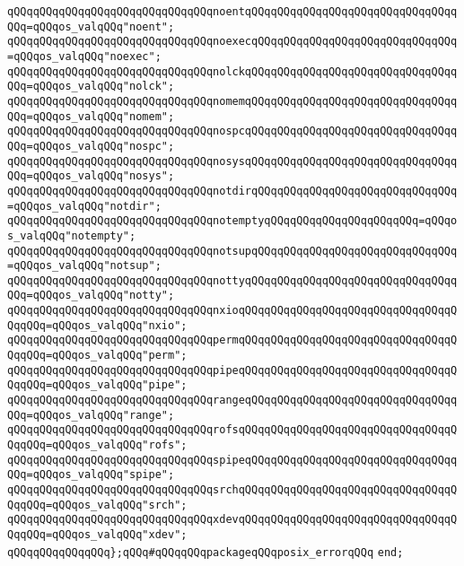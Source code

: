 \verb|qQQqqQQqqQQqqQQqqQQqqQQqqQQqqQQqnoentqQQqqQQqqQQqqQQqqQQqqQQqqQQqqQQqqQQq=qQQqos_valqQQq"noent";|\newline
\verb|qQQqqQQqqQQqqQQqqQQqqQQqqQQqqQQqnoexecqQQqqQQqqQQqqQQqqQQqqQQqqQQqqQQq=qQQqos_valqQQq"noexec";|\newline
\verb|qQQqqQQqqQQqqQQqqQQqqQQqqQQqqQQqnolckqQQqqQQqqQQqqQQqqQQqqQQqqQQqqQQqqQQq=qQQqos_valqQQq"nolck";|\newline
\verb|qQQqqQQqqQQqqQQqqQQqqQQqqQQqqQQqnomemqQQqqQQqqQQqqQQqqQQqqQQqqQQqqQQqqQQq=qQQqos_valqQQq"nomem";|\newline
\verb|qQQqqQQqqQQqqQQqqQQqqQQqqQQqqQQqnospcqQQqqQQqqQQqqQQqqQQqqQQqqQQqqQQqqQQq=qQQqos_valqQQq"nospc";|\newline
\verb|qQQqqQQqqQQqqQQqqQQqqQQqqQQqqQQqnosysqQQqqQQqqQQqqQQqqQQqqQQqqQQqqQQqqQQq=qQQqos_valqQQq"nosys";|\newline
\verb|qQQqqQQqqQQqqQQqqQQqqQQqqQQqqQQqnotdirqQQqqQQqqQQqqQQqqQQqqQQqqQQqqQQq=qQQqos_valqQQq"notdir";|\newline
\verb|qQQqqQQqqQQqqQQqqQQqqQQqqQQqqQQqnotemptyqQQqqQQqqQQqqQQqqQQqqQQq=qQQqos_valqQQq"notempty";|\newline
\verb|qQQqqQQqqQQqqQQqqQQqqQQqqQQqqQQqnotsupqQQqqQQqqQQqqQQqqQQqqQQqqQQqqQQq=qQQqos_valqQQq"notsup";|\newline
\verb|qQQqqQQqqQQqqQQqqQQqqQQqqQQqqQQqnottyqQQqqQQqqQQqqQQqqQQqqQQqqQQqqQQqqQQq=qQQqos_valqQQq"notty";|\newline
\verb|qQQqqQQqqQQqqQQqqQQqqQQqqQQqqQQqnxioqQQqqQQqqQQqqQQqqQQqqQQqqQQqqQQqqQQqqQQq=qQQqos_valqQQq"nxio";|\newline
\verb|qQQqqQQqqQQqqQQqqQQqqQQqqQQqqQQqpermqQQqqQQqqQQqqQQqqQQqqQQqqQQqqQQqqQQqqQQq=qQQqos_valqQQq"perm";|\newline
\verb|qQQqqQQqqQQqqQQqqQQqqQQqqQQqqQQqpipeqQQqqQQqqQQqqQQqqQQqqQQqqQQqqQQqqQQqqQQq=qQQqos_valqQQq"pipe";|\newline
\verb|qQQqqQQqqQQqqQQqqQQqqQQqqQQqqQQqrangeqQQqqQQqqQQqqQQqqQQqqQQqqQQqqQQqqQQq=qQQqos_valqQQq"range";|\newline
\verb|qQQqqQQqqQQqqQQqqQQqqQQqqQQqqQQqrofsqQQqqQQqqQQqqQQqqQQqqQQqqQQqqQQqqQQqqQQq=qQQqos_valqQQq"rofs";|\newline
\verb|qQQqqQQqqQQqqQQqqQQqqQQqqQQqqQQqspipeqQQqqQQqqQQqqQQqqQQqqQQqqQQqqQQqqQQq=qQQqos_valqQQq"spipe";|\newline
\verb|qQQqqQQqqQQqqQQqqQQqqQQqqQQqqQQqsrchqQQqqQQqqQQqqQQqqQQqqQQqqQQqqQQqqQQqqQQq=qQQqos_valqQQq"srch";|\newline
\verb|qQQqqQQqqQQqqQQqqQQqqQQqqQQqqQQqxdevqQQqqQQqqQQqqQQqqQQqqQQqqQQqqQQqqQQqqQQq=qQQqos_valqQQq"xdev";|\newline
\newline
\verb|qQQqqQQqqQQqqQQq};qQQq#qQQqqQQqpackageqQQqposix_errorqQQq|\newline
\verb|end;|\newline
\newline
\newline

